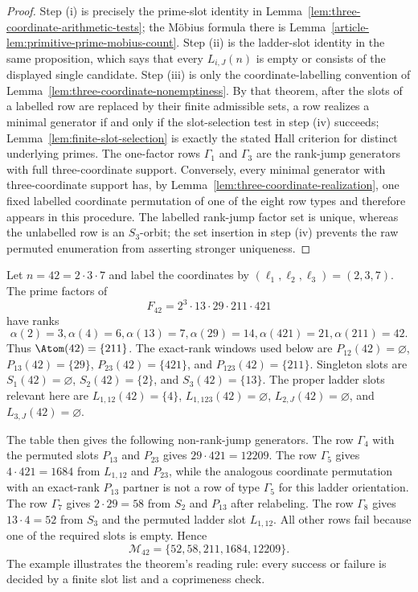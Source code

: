 \begin{proof}
Step (i) is precisely the prime-slot identity in
Lemma~\ref{lem:three-coordinate-arithmetic-tests}; the M\"obius formula
there is Lemma~\ref{article-lem:primitive-prime-mobius-count}.  Step (ii) is the
ladder-slot identity in the same proposition, which says that every
$L_{i,J}(n)$ is empty or consists of the displayed single candidate.  Step
(iii) is only the coordinate-labelling convention of
Lemma~\ref{lem:three-coordinate-nonemptiness}.  By that theorem, after the
slots of a labelled row are replaced by their finite admissible sets, a row
realizes a minimal generator if and only if the slot-selection test in step
(iv) succeeds; Lemma~\ref{lem:finite-slot-selection} is exactly the stated
Hall criterion for distinct underlying primes.  The one-factor rows
$\Gamma_1$ and $\Gamma_3$ are the rank-jump generators with full
three-coordinate support.  Conversely, every minimal generator with
three-coordinate support has, by
Lemma~\ref{lem:three-coordinate-realization}, one fixed labelled
coordinate permutation of one of the eight row types and therefore appears in
this procedure. The labelled rank-jump factor set is unique, whereas the
unlabelled row is an $S_3$-orbit; the set insertion in step (iv) prevents the
raw permuted enumeration from asserting stronger uniqueness.
\end{proof}

\begin{example}[Applying the checklist at $n=42$]
\label{ex:n42-three-coordinate-checklist}
Let $n=42=2\cdot3\cdot7$ and label the coordinates by
$(\ell_1,\ell_2,\ell_3)=(2,3,7)$.  The prime factors of
\[
F_{42}=2^3\cdot13\cdot29\cdot211\cdot421
\]
have ranks
\[
\alpha(2)=3,
\alpha(4)=6,
\alpha(13)=7,
\alpha(29)=14,
\alpha(421)=21,
\alpha(211)=42.
\]
Thus $\Atom(42)=\{211\}$. The exact-rank windows used below are
$P_{12}(42)=\varnothing$, $P_{13}(42)=\{29\}$,
$P_{23}(42)=\{421\}$, and $P_{123}(42)=\{211\}$.  Singleton slots are
$S_1(42)=\varnothing$, $S_2(42)=\{2\}$, and $S_3(42)=\{13\}$.  The proper
ladder slots relevant here are
$L_{1,12}(42)=\{4\}$, $L_{1,123}(42)=\varnothing$,
$L_{2,J}(42)=\varnothing$, and $L_{3,J}(42)=\varnothing$.

The table then gives the following non-rank-jump generators.  The row
$\Gamma_4$ with the permuted slots $P_{13}$ and $P_{23}$ gives
$29\cdot421=12209$.  The row $\Gamma_5$ gives
$4\cdot421=1684$ from $L_{1,12}$ and $P_{23}$, while the analogous
coordinate permutation with an exact-rank $P_{13}$ partner is not a row of type
$\Gamma_5$ for this ladder orientation.  The row $\Gamma_7$ gives
$2\cdot29=58$ from $S_2$ and $P_{13}$ after relabeling.  The row $\Gamma_8$
gives $13\cdot4=52$ from $S_3$ and the permuted ladder slot $L_{1,12}$.
All other rows fail because one of the required slots is empty.  Hence
\[
\mathcal M_{42}=\{52,58,211,1684,12209\}.
\]
The example illustrates the theorem's reading rule: every success or failure
is decided by a finite slot list and a coprimeness check.
\end{example}


